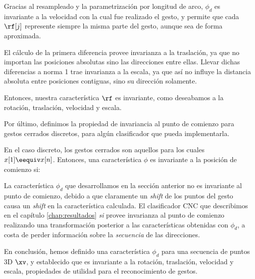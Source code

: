 Gracias al resampleado y la parametrización por longitud de arco, $\phi_d$ es invariante a la velocidad con la cual fue realizado el gesto, y permite que cada $\rf[j]$ represente siempre la misma parte del gesto, aunque sea de forma aproximada.

El cálculo de la primera diferencia provee invarianza a la traslación, ya que no importan las posiciones absolutas sino las direcciones entre ellas. Llevar dichas diferencias a norma 1 trae invarianza a la escala, ya que así no influye la distancia absoluta entre posiciones contiguas, sino su dirección solamente.

Entonces, nuestra característica $\rf$ es invariante, como deseabamos a la rotación, traslación, velocidad y escala.

Por último, definimos la propiedad de invariancia al punto de comienzo para gestos cerrados discretos, para algún clasificador que pueda implementarla.

En el caso discreto, los gestos cerrados son aquellos para los cuales $x[1] \eequiv x[n]$. Entonces, una característica $\phi$ es invariante a la posición de comienzo si:


La característica $\phi_d$ que desarrollamos en la sección anterior no es invariante al punto de comienzo, debido a que claramente un \textit{shift} de los puntos del gesto causa un \textit{shift} en la característica calculada. El clasificador CNC que describimos en el  capítulo \ref{chap:resultados} \textit{si} provee invarianza al punto de comienzo realizando una transformación posterior a las características obtenidas con $\phi_d$, a costa de perder información sobre la \textit{secuencia} de las direcciones.

En conclusión, hemos definido una característica $\phi_d$ para una secuencia de puntos 3D $\xv$, y establecido que es invariante a la rotación, traslación, velocidad y escala, propiedades de utilidad para el reconocimiento de gestos.